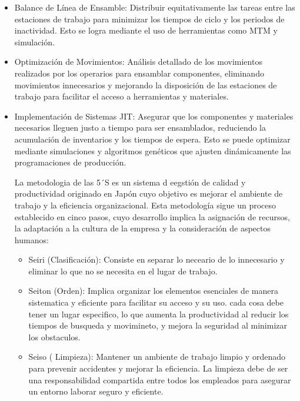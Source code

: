    \begin{itemize}
       \item Balance de Línea de Ensamble: Distribuir equitativamente las tareas entre las estaciones de trabajo para minimizar los tiempos de ciclo y los periodos de inactividad. Esto se logra mediante el uso de herramientas como MTM y simulación.
       \item Optimización de Movimientos: Análisis detallado de los movimientos realizados por los operarios para ensamblar componentes, eliminando movimientos innecesarios y mejorando la disposición de las estaciones de trabajo para facilitar el acceso a herramientas y materiales. 
       \item Implementación de Sistemas JIT: Asegurar que los componentes y materiales necesarios lleguen justo a tiempo para ser ensamblados, reduciendo la acumulación de inventarios y los tiempos de espera. Esto se puede optimizar mediante simulaciones y algoritmos genéticos que ajusten dinámicamente las programaciones de producción.
       
    La metodologia de las 5´S es un sistema d eegstión de calidad y productividad originado en Japón cuyo objetivo es mejorar el ambiente de trabajo y la eficiencia organizacional. Esta metodología sigue un proceso establecido en cinco pasos, cuyo desarrollo implica la asignación de recursos, la adaptación a la cultura de la empresa y la consideración de aspectos humanos:
    
    \begin{itemize}
        \item Seiri (Clasificación): Consiste en separar lo neceario de lo innecesario y eliminar lo que no se necesita en el lugar de trabajo.
        \item Seiton (Orden): Implica organizar los elementos esenciales de manera sistematica y eficiente para facilitar su acceso y su uso. cada cosa debe tener un lugar especifico, lo que aumenta la productividad al reducir los tiempos de busqueda y movimineto, y mejora la seguridad al minimizar los obstaculos.
        \item Seiso ( Limpieza): Mantener un ambiente de trabajo limpio y ordenado para prevenir accidentes y mejorar la eficiencia. La limpieza debe de ser una responsabilidad compartida entre todos los empleados para asegurar un entorno laborar seguro y eficiente.
        
   \end{itemize}





\end{itemize}
